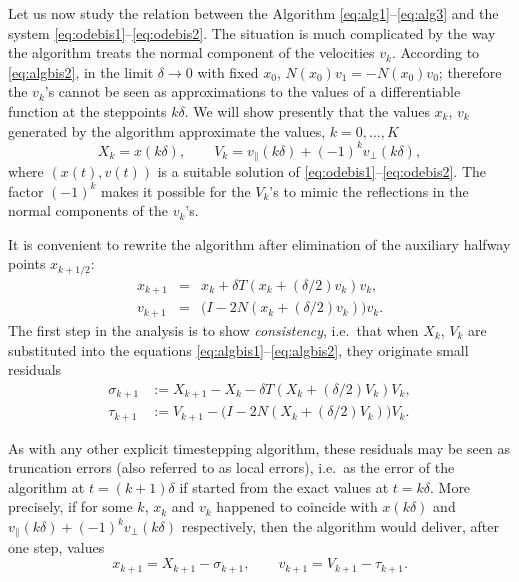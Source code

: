 \documentclass[10pt]{article}
\newcommand{\vperp}{v_\perp}
\newcommand{\vpar}{v_\|}
\begin{document}
Let us now study the relation between the Algorithm \eqref{eq:alg1}--\eqref{eq:alg3} and the system \eqref{eq:odebis1}--\eqref{eq:odebis2}.
The situation is much complicated by the way the algorithm
treats the normal component of the velocities \(v_k\). According to \eqref{eq:algbis2}, in the limit \(\delta\rightarrow 0\) with fixed \(x_0\), \(N(x_0)v_1=-N(x_0)v_0\); therefore the \(v_k\)'s cannot be seen as approximations to the values of a differentiable function at the steppoints \(k\delta\).
We will show presently that the values \(x_k\), \(v_k\) generated by the algorithm approximate the values, \(k=0,\dots,K\)
\begin{equation}\label{eq:definition}
X_k = x(k\delta),\qquad V_k = \vpar(k\delta)+(-1)^k\vperp(k\delta),
\end{equation}
where \((x(t),v(t))\) is a suitable solution of \eqref{eq:odebis1}--\eqref{eq:odebis2}. The factor \((-1)^k\)
makes it possible for the \(V_k\)'s to mimic the reflections in the normal components of the \(v_k\)'s.

It is convenient to rewrite the algorithm after elimination of the auxiliary halfway points \(x_{k+1/2}\):
\begin{eqnarray}\label{eq:algbis1}
x_{k+1} &=& x_k+\delta T(x_k+(\delta/2)v_k)v_k,\\\label{eq:algbis2}
v_{k+1} &= & \big(I-2N(x_k+(\delta/2)v_k)\big)v_k.
\end{eqnarray}
%
The first step in the analysis is to show \emph{consistency}, i.e.\ that
when \(X_k\), \(V_k\) are substituted into the equations \eqref{eq:algbis1}--\eqref{eq:algbis2}, they originate small residuals
\begin{align}\label{eq:sigma}
\sigma_{k+1} &:= X_{k+1}- X_k-\delta T(X_k+(\delta/2)V_k)V_k,\\
\label{eq:tau}
\tau_{k+1} &:= V_{k+1} - \big(I-2N(X_k+(\delta/2)V_k)\big)V_k.
\end{align}

As with any other explicit timestepping algorithm, these residuals may be seen as truncation errors (also referred to as local errors), i.e.\ as the error of the algorithm at \(t=(k+1)\delta\) if started from the exact values at \(t=k\delta\). More precisely,
if for some \(k\), \(x_k\) and \(v_k\) happened to coincide with \(x(k\delta)\) and \(\vpar(k\delta)+(-1)^k\vperp(k\delta)\) respectively, then the algorithm would deliver, after one step, values \[x_{k+1}=X_{k+1}-\sigma_{k+1}, \qquad v_{k+1}=V_{k+1}-\tau_{k+1}.\]
\end{document}
